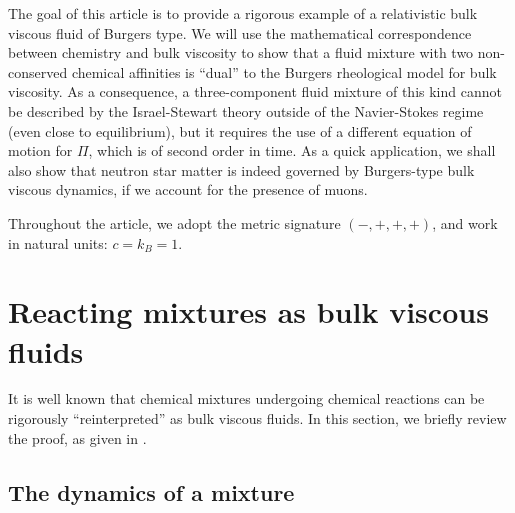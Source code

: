 \documentclass[a4paper, amsfonts, amssymb, amsmath, reprint, showkeys, nofootinbib, twoside, onecolumn,notitlepage]{revtex4-1}
\begin{document}
The goal of this article is to provide a rigorous example of a relativistic bulk viscous fluid of Burgers type. We will use the mathematical correspondence between chemistry and bulk viscosity \cite{BulkGavassino} to show that a fluid mixture with two non-conserved chemical affinities is ``dual'' to the Burgers rheological model for bulk viscosity. As a consequence, a three-component fluid mixture of this kind cannot be described by the Israel-Stewart theory outside of the Navier-Stokes regime (even close to equilibrium), but it requires the use of a different equation of motion for $\Pi$, which is of second order in time. As a quick application, we shall also show that neutron star matter is indeed governed by Burgers-type bulk viscous dynamics, if we account for the presence of muons.


Throughout the article, we adopt the metric signature $(-,+,+,+)$, and work in natural units: $c=k_B=1$. 

\section{Reacting mixtures as bulk viscous fluids}\label{sec2}

It is well known \cite{landau6,Sawyer_Bulk1989,BulkGavassino} that chemical mixtures undergoing chemical reactions can be rigorously ``reinterpreted'' as bulk viscous fluids. In this section, we briefly review the proof, as given in \cite{BulkGavassino}.

\subsection{The dynamics of a mixture}\label{dynamo}

\end{document}
